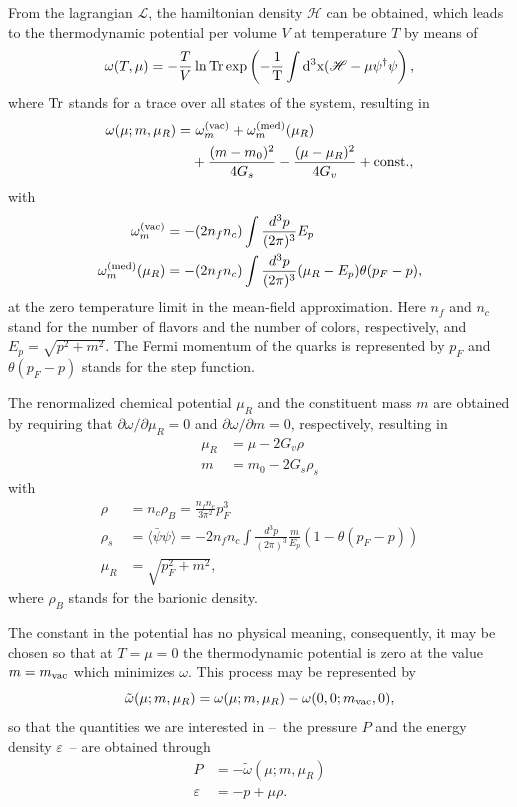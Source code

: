 \documentclass[prc, reprint, amsmath, floatfix,10pt]{revtex4-1}
\newcommand{\tr}{\rm{Tr}}
\begin{document}
From the lagrangian $\mathscr{L}$, the hamiltonian density $\mathscr{H}$ can be obtained, which leads to the thermodynamic potential per volume $V$ at temperature $T$ by means of
\begin{equation}
	\omega(T, \mu) = -\frac{T}{V} \ln \tr \exp\left(-\frac{1}{T}\int d^3x(\mathscr{H} - \mu\psi^\dagger\psi\right),
\end{equation}
%
where $\tr$ stands for a trace over all states of the system, resulting in \cite{Buballa1996}
\begin{equation}\label{Eq:Pot_Termo_Temp_zero}
\begin{split}
	\omega(\mu; m, \mu_R) =&~ \omega_m^{(\rm{vac})} + \omega_m^{(\rm{med})}(\mu_R) \\
	&+ \frac{(m - m_0)^2}{4G_s} - \frac{(\mu - \mu_R)^2}{4G_v} +  \textrm{const.},
\end{split}
\end{equation}
%
with
\begin{align}
	\omega_m^{(\rm{vac})} &= -(2 n_f n_c) \int \frac{d^3p}{(2\pi)^3} E_p\\
	\omega_m^{(\rm{med})}(\mu_R) &= - (2n_f n_c) \int\frac{d^3p}{(2 \pi)^3} (\mu_R - E_p) \theta(p_F -p),
\end{align}
%
at the zero temperature limit in the mean-field approximation. Here $n_f$ and $n_c$ stand for the number of flavors and the number of colors, respectively, and $E_p = \sqrt{p^2 + m^2}$. The Fermi momentum of the quarks is represented by $p_F$ and $\theta(p_F - p)$ stands for the step function.

The renormalized chemical potential $\mu_R$ and the constituent mass $m$ are obtained by requiring that $\partial \omega / \partial \mu_R = 0$ and $\partial \omega / \partial m = 0$, respectively, resulting in
\begin{align}
	\mu_R &= \mu - 2 G_v \rho \\
	m &= m_0 - 2 G_s \rho_s
\end{align}
%
with
\begin{align}
	\rho &= n_c \rho_B = \frac{n_f n_c}{3\pi^2} p_F^3 \\
	\rho_s &= \langle \bar\psi\psi\rangle = - 2 n_f n_c \int\frac{d^3p}{(2\pi)^3} \frac{m}{E_p}(1 - \theta(p_F - p)) \\
	\mu_R &= \sqrt{p_F^2 + m^2},
\end{align}
%
where $\rho_B$ stands for the barionic density.

The constant in the potential has no physical meaning, consequently, it may be chosen so that at $T = \mu = 0$ the thermodynamic potential is zero at the value $m = m_{\rm{vac}}$ which minimizes $\omega$. This process may be represented by 
\begin{equation}
	\tilde\omega(\mu; m, \mu_R) = \omega(\mu; m, \mu_R) - \omega(0, 0; m_{\rm{vac}}, 0),
\end{equation}
%
so that the quantities we are interested in --~the pressure $P$ and the energy density $\varepsilon$~-- are obtained through
\begin{align}
		P &= -\tilde\omega(\mu; m, \mu_R) \label{Exp_pressao_T}\\
		\varepsilon &= -p + \mu \rho. \label{Exp_energia_T}
\end{align}
	
\end{document}
